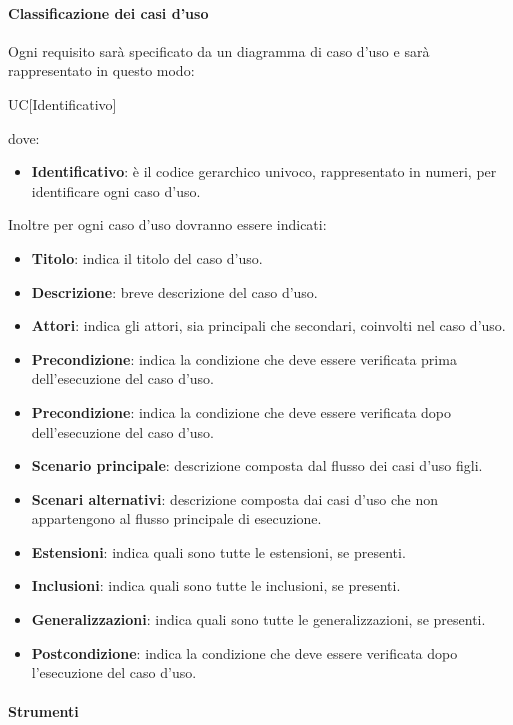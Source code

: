 \paragraph{Classificazione dei casi d'uso}
Ogni requisito sarà specificato da un diagramma di caso d'uso e sarà rappresentato in questo modo:
\begin{center}
  UC[Identificativo]
\end{center}
dove:
\begin{itemize}
  \item\textbf{Identificativo}: è il codice gerarchico univoco, rappresentato in numeri, per identificare ogni caso d'uso.
\end{itemize}
Inoltre per ogni caso d'uso dovranno essere indicati:
\begin{itemize}
  \item\textbf{Titolo}: indica il titolo del caso d'uso.
  \item\textbf{Descrizione}: breve descrizione del caso d'uso.
  \item\textbf{Attori}: indica gli attori, sia principali che secondari, coinvolti nel caso d'uso.
  \item\textbf{Precondizione}: indica la condizione che deve essere verificata prima
  dell'esecuzione del caso d'uso.
   \item\textbf{Precondizione}: indica la condizione che deve essere verificata dopo dell'esecuzione del caso d'uso.
  \item\textbf{Scenario principale}: descrizione composta dal flusso dei casi d'uso
  figli.
  \item\textbf{Scenari alternativi}: descrizione composta dai casi d'uso che non
  appartengono al flusso principale di esecuzione.
  \item\textbf{Estensioni}: indica quali sono tutte le estensioni, se presenti.
  \item\textbf{Inclusioni}: indica quali sono tutte le inclusioni, se presenti.
  \item\textbf{Generalizzazioni}: indica quali sono tutte le generalizzazioni,
  se presenti.
  \item\textbf{Postcondizione}: indica la condizione che deve essere verificata dopo
  l'esecuzione del caso d'uso.
\end{itemize}

\paragraph{Strumenti}

